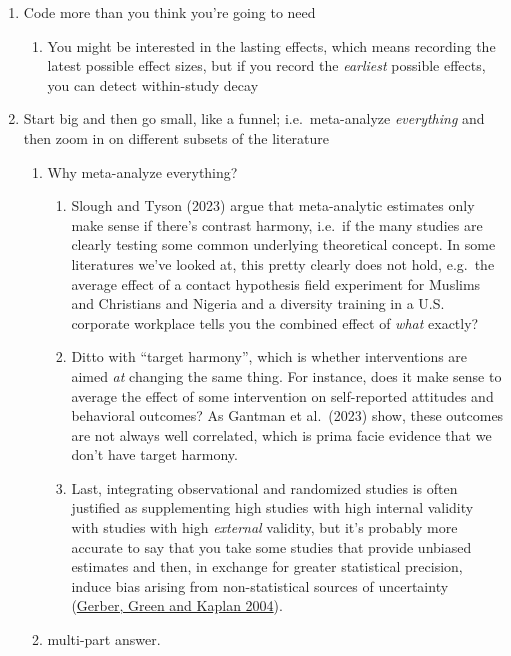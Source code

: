 \documentclass[
  man]{apa6}
\providecommand{\tightlist}{%
  \setlength{\itemsep}{0pt}\setlength{\parskip}{0pt}}
\begin{document}
\begin{enumerate}
\def\labelenumi{\arabic{enumi}.}
\tightlist
\item
  Code more than you think you're going to need

  \begin{enumerate}
  \def\labelenumii{\arabic{enumii}.}
  \tightlist
  \item
    You might be interested in the lasting effects, which means recording the latest possible effect sizes, but if you record the \emph{earliest} possible effects, you can detect within-study decay
  \end{enumerate}
\item
  Start big and then go small, like a funnel; i.e.~meta-analyze \emph{everything} and then zoom in on different subsets of the literature

  \begin{enumerate}
  \def\labelenumii{\arabic{enumii}.}
  \setcounter{enumii}{1}
  \tightlist
  \item
    Why meta-analyze everything?

    \begin{enumerate}
    \def\labelenumiii{\arabic{enumiii}.}
    \tightlist
    \item
      Slough and Tyson (2023) argue that meta-analytic estimates only make sense if there's contrast harmony, i.e.~if the many studies are clearly testing some common underlying theoretical concept. In some literatures we've looked at, this pretty clearly does not hold, e.g.~the average effect of a contact hypothesis field experiment for Muslims and Christians and Nigeria and a diversity training in a U.S. corporate workplace tells you the combined effect of \emph{what} exactly?
    \item
      Ditto with ``target harmony'', which is whether interventions are aimed \emph{at} changing the same thing. For instance, does it make sense to average the effect of some intervention on self-reported attitudes and behavioral outcomes? As Gantman et al.~(2023) show, these outcomes are not always well correlated, which is prima facie evidence that we don't have target harmony.
    \item
      Last, integrating observational and randomized studies is often justified as supplementing high studies with high internal validity with studies with high \emph{external} validity, but it's probably more accurate to say that you take some studies that provide unbiased estimates and then, in exchange for greater statistical precision, induce bias arising from non-statistical sources of uncertainty (\href{http://www.donaldgreen.com/wp-content/uploads/2015/09/Gerber-Green-Kaplan-IllusionofLearning.pdf}{Gerber, Green and Kaplan 2004}).
    \end{enumerate}
  \item
    multi-part answer.


\end{enumerate}
\end{enumerate}
\end{document}
